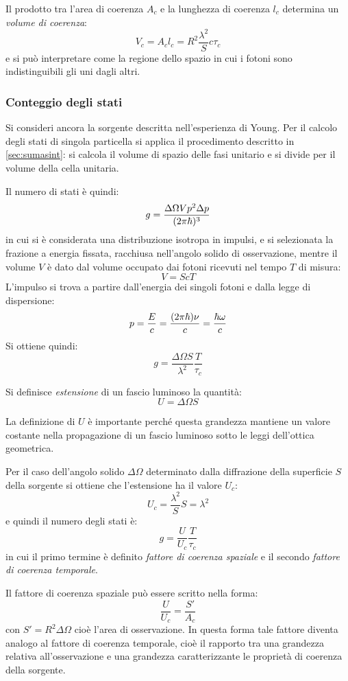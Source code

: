 Il prodotto tra l'area di coerenza $ A_c $ e la lunghezza di coerenza $ l_c $ determina un \textit{volume di coerenza}:
\[ V_c = A_c l_c = R^2 \frac{\lambda^2}{S} c \tau_c\]
e si può interpretare come la regione dello spazio in cui i fotoni sono indistinguibili gli uni dagli altri.

\subsubsection{Conteggio degli stati}

Si consideri ancora la sorgente descritta nell'esperienza di Young. Per il calcolo degli stati di singola particella si applica il procedimento descritto in \cref{sec:sumasint}: si calcola il volume di spazio delle fasi unitario e si divide per il volume della cella unitaria.

Il numero di stati è quindi:
\[ g = \frac{\Delta\Omega V p^2 \Delta p}{(2\pi \hbar)^3} \]
in cui si è considerata una distribuzione isotropa in impulsi, e si selezionata la frazione a energia fissata, racchiusa nell'angolo solido di osservazione, mentre il volume $ V $ è dato dal volume occupato dai fotoni ricevuti nel tempo $ T $ di misura:
\[ V = S c T \]
L'impulso si trova a partire dall'energia dei singoli fotoni e dalla legge di dispersione:
\[ p = \frac{E}{c} = \frac{(2\pi \hbar)\nu}{c} = \frac{\hbar \omega}{c} \]
Si ottiene quindi:
\[ g = \frac{\Delta\Omega S}{\lambda^2} \frac{T}{\tau_c} \]

\begin{defn}
	Si definisce \textit{estensione} di un fascio luminoso la quantità:
	\begin{equation*}
	U = \Delta\Omega S
	\end{equation*}
\end{defn}
La definizione di $ U $ è importante perché questa grandezza mantiene un valore costante nella propagazione di un fascio luminoso sotto le leggi dell'ottica geometrica.

Per il caso dell'angolo solido $ \Delta\Omega $ determinato dalla diffrazione della superficie $ S $ della sorgente si ottiene che l'estensione ha il valore $ U_c $:
\[ U_c = \frac{\lambda^2}{S} S = \lambda^2 \]
e quindi il numero degli stati è:
\[ g = \frac{U}{U_c} \frac{T}{\tau_c} \]
in cui il primo termine è definito \textit{fattore di coerenza spaziale} e il secondo \textit{fattore di coerenza temporale}.

\begin{oss}
	Il fattore di coerenza spaziale può essere scritto nella forma:
	\[ \frac{U}{U_c} = \frac{S'}{A_c} \]
	con $ S' = R^2 \Delta\Omega $ cioè l'area di osservazione. In questa forma tale fattore diventa analogo al fattore di coerenza temporale, cioè il rapporto tra una grandezza relativa all'osservazione e una grandezza caratterizzante le proprietà di coerenza della sorgente.
\end{oss}

